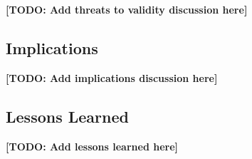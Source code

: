 \textbf{[TODO: Add threats to validity discussion here]}

\subsection{Implications}


\textbf{[TODO: Add implications discussion here]}

\subsection{Lessons Learned}


\textbf{[TODO: Add lessons learned here]}
